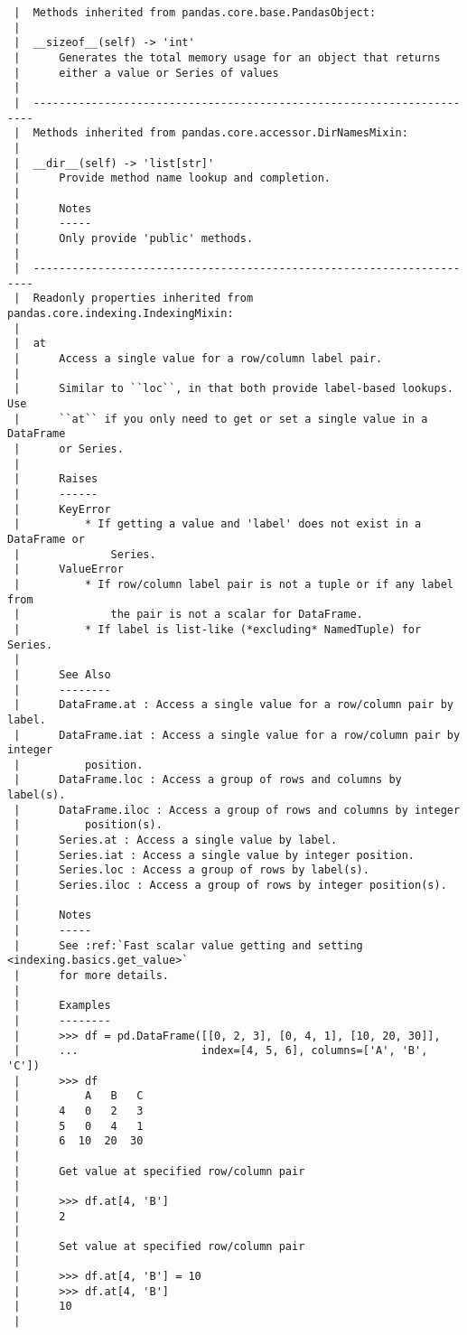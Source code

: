 \documentclass[
  letterpaper,
  DIV=11,
  numbers=noendperiod]{scrreprt}
\begin{document}
\begin{verbatim}
 |  Methods inherited from pandas.core.base.PandasObject:
 |  
 |  __sizeof__(self) -> 'int'
 |      Generates the total memory usage for an object that returns
 |      either a value or Series of values
 |  
 |  ----------------------------------------------------------------------
 |  Methods inherited from pandas.core.accessor.DirNamesMixin:
 |  
 |  __dir__(self) -> 'list[str]'
 |      Provide method name lookup and completion.
 |      
 |      Notes
 |      -----
 |      Only provide 'public' methods.
 |  
 |  ----------------------------------------------------------------------
 |  Readonly properties inherited from pandas.core.indexing.IndexingMixin:
 |  
 |  at
 |      Access a single value for a row/column label pair.
 |      
 |      Similar to ``loc``, in that both provide label-based lookups. Use
 |      ``at`` if you only need to get or set a single value in a DataFrame
 |      or Series.
 |      
 |      Raises
 |      ------
 |      KeyError
 |          * If getting a value and 'label' does not exist in a DataFrame or
 |              Series.
 |      ValueError
 |          * If row/column label pair is not a tuple or if any label from
 |              the pair is not a scalar for DataFrame.
 |          * If label is list-like (*excluding* NamedTuple) for Series.
 |      
 |      See Also
 |      --------
 |      DataFrame.at : Access a single value for a row/column pair by label.
 |      DataFrame.iat : Access a single value for a row/column pair by integer
 |          position.
 |      DataFrame.loc : Access a group of rows and columns by label(s).
 |      DataFrame.iloc : Access a group of rows and columns by integer
 |          position(s).
 |      Series.at : Access a single value by label.
 |      Series.iat : Access a single value by integer position.
 |      Series.loc : Access a group of rows by label(s).
 |      Series.iloc : Access a group of rows by integer position(s).
 |      
 |      Notes
 |      -----
 |      See :ref:`Fast scalar value getting and setting <indexing.basics.get_value>`
 |      for more details.
 |      
 |      Examples
 |      --------
 |      >>> df = pd.DataFrame([[0, 2, 3], [0, 4, 1], [10, 20, 30]],
 |      ...                   index=[4, 5, 6], columns=['A', 'B', 'C'])
 |      >>> df
 |          A   B   C
 |      4   0   2   3
 |      5   0   4   1
 |      6  10  20  30
 |      
 |      Get value at specified row/column pair
 |      
 |      >>> df.at[4, 'B']
 |      2
 |      
 |      Set value at specified row/column pair
 |      
 |      >>> df.at[4, 'B'] = 10
 |      >>> df.at[4, 'B']
 |      10
 |      

\end{verbatim}
\end{document}
